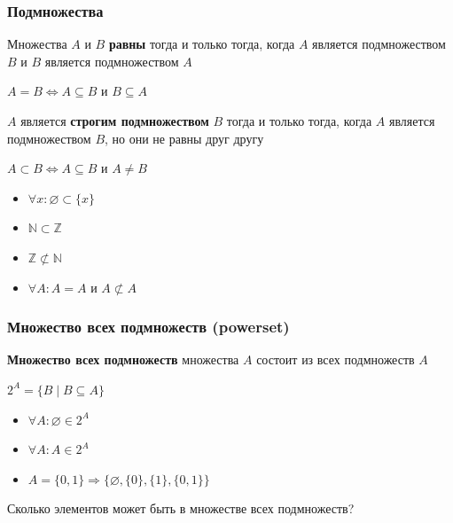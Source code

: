 \documentclass{beamer}
\begin{document}
\begin{frame}[fragile]
  \transwipe[direction=90]
  \frametitle{Подмножества}
  Множества $A$ и $B$ \textbf{равны} тогда и только тогда, когда $A$ является подмножеством $B$ и $B$ является подмножеством $A$

  \begin{center}
    $ A = B \iff A \subseteq B $ и $ B \subseteq A$
  \end{center}
  \pause
  $A$ является \textbf{строгим подмножеством} $B$ тогда и только тогда, когда $A$ является подмножеством $B$, но они не равны друг другу

  \begin{center}
     $ A \subset B \iff A \subseteq B $ и $ A \neq B $
  \end{center}

  \pause
  \begin{itemize}
     \item $\forall x : \varnothing \subset \{ x \}$
     \item $\mathbb{N} \subset \mathbb{Z}$
     \item $\mathbb{Z} \not\subset \mathbb{N}$
     \item $\forall A: A = A $ и $ A \not\subset A $

  \end{itemize}
\end{frame}

\begin{frame}[fragile]
  \transwipe[direction=90]
  \frametitle{Множество всех подмножеств (powerset)}
  \textbf{Множество всех подмножеств} множества $A$ состоит из всех подмножеств $A$

  \begin{center}
    $2^A = \{ B \mid B \subseteq A \}$
  \end{center}

  \begin{itemize}
    \item $\forall A: \varnothing \in 2^A$
    \item $\forall A: A \in 2^A$
    \item $A = \{ 0, 1 \} \Rightarrow \{ \varnothing, \{ 0 \}, \{ 1 \}, \{ 0, 1 \} \} $
  \end{itemize}

  \pause
  Сколько элементов может быть в множестве всех подмножеств?
\end{frame}
\end{document}
